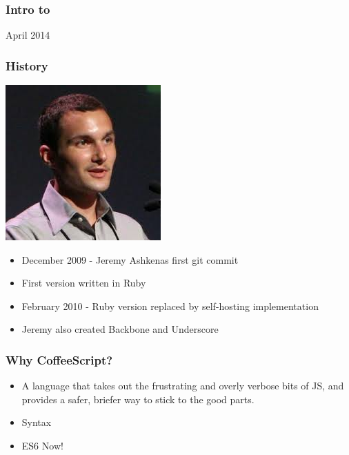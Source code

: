 \documentclass{beamer}
\begin{document}
\begin{frame}
  \frametitle{Intro to}

  April 2014

\end{frame}

\begin{frame}
  \frametitle{History}
  \includegraphics[scale=.60]{jeremy}  
  \begin{itemize}
    \item December 2009 - Jeremy Ashkenas first git commit
      \pause
    \item First version written in Ruby
      \pause
    \item February 2010 - Ruby version replaced by self-hosting
      implementation
      \pause
    \item Jeremy also created Backbone and Underscore
  \end{itemize}  
\end{frame}



\begin{frame}
  \frametitle{Why CoffeeScript?}
  \begin{itemize}
    \pause
    \item A language that takes out the frustrating and overly verbose bits of JS, and provides a safer, briefer way to stick to the good parts.
      \pause
    \item Syntax
    \pause
    \item ES6 Now!
  \end{itemize}
\end{frame}
\end{document}
